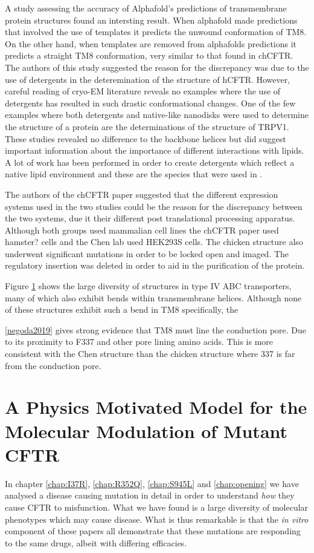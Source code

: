 A study assessing the accuracy of Alphafold's predictions of transmembrane protein structures found an intersting result. When alphafold made predictions that involved the use of templates it predicts the unwound conformation of TM8. On the other hand, when templates are removed from alphafolds predictions it predicts a straight TM8 conformation, very similar to that found in chCFTR. The authors of this study suggested the reason for the discrepancy was due to the use of detergents in the deteremination of the structure of hCFTR. However, careful reading of cryo-EM literature reveals no examples where the use of detergents has resulted in such drastic conformational changes. One of the few examples where both detergents and native-like nanodisks were used to determine the structure of a protein are the determinations of the structure of TRPV1. These studies revealed no difference to the backbone helices but did suggest important information about the importance of different interactions with lipids. A lot of work has been performed in order to create detergents which reflect a native lipid environment and these are the species that were used in . 

The authors of the chCFTR paper suggested that the different expression systems used in the two studies could be the reason for the discrepancy between the two systems, due it their different post translational processing apparatus. Although both groups used mammalian cell lines the chCFTR paper used hamster? cells \cite{aleksandrov2015} and the Chen lab used HEK293S cells. The chicken structure also underwent significant mutations in order to be locked open and imaged. The regulatory insertion was deleted in order to aid in the purification of the protein. 

Figure \ref{} shows the large diversity of structures in type IV ABC transporters, many of which also exhibit bends within transmembrane helices\cite{thomas2020}. Although none of these structures exhibit such a bend in TM8 specifically, the 

\ref{negoda2019} gives strong evidence that TM8 must line the conduction pore. Due to its proximity to F337 and other pore lining amino acids. This is more consistent with the Chen structure than the chicken structure where 337 is far from the conduction pore.

\section{A Physics Motivated Model for the Molecular Modulation of Mutant CFTR }
In chapter \ref{chap:I37R}, \ref{chap:R352Q}, \ref{chap:S945L} and \ref{chap:opening} we have analysed a disease causing mutation in detail in order to understand \textit{how} they cause CFTR to misfunction. What we have found is a large diversity of molecular phenotypes which may cause disease. What is thus remarkable is that the \textit{in vitro} component of these papers all demonstrate that these mutations are responding to the same drugs, albeit with differing efficacies.



